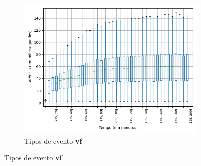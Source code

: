 \begin{figure}
\centering
\begin{subfigure}{.5\textwidth}
\centering
\includegraphics[width=\textwidth]{figuras/graphics/boxplot_7-dez-is_vf.png}
\caption{Tipos de evento \textbf{vf}}
\label{fig:BoxPlot_vf_7-dez-is}
\end{subfigure}%


\end{figure}

